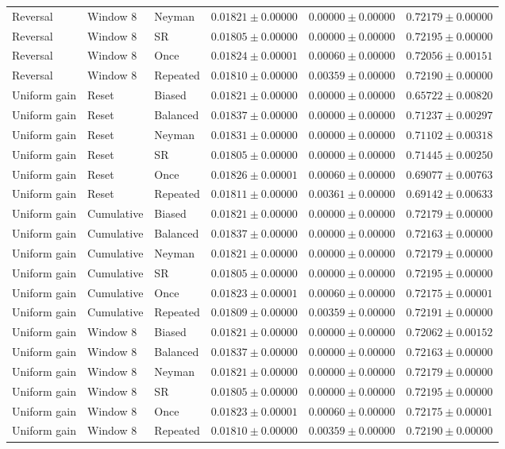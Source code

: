 \begin{longtable}{@{}llllll@{}}
Reversal & Window 8 & Neyman & $0.01821 \pm 0.00000$ & $0.00000 \pm 0.00000$ & $0.72179 \pm 0.00000$ \\
Reversal & Window 8 & SR & $0.01805 \pm 0.00000$ & $0.00000 \pm 0.00000$ & $0.72195 \pm 0.00000$ \\
Reversal & Window 8 & Once & $0.01824 \pm 0.00001$ & $0.00060 \pm 0.00000$ & $0.72056 \pm 0.00151$ \\
Reversal & Window 8 & Repeated & $0.01810 \pm 0.00000$ & $0.00359 \pm 0.00000$ & $0.72190 \pm 0.00000$ \\
Uniform gain & Reset & Biased & $0.01821 \pm 0.00000$ & $0.00000 \pm 0.00000$ & $0.65722 \pm 0.00820$ \\
Uniform gain & Reset & Balanced & $0.01837 \pm 0.00000$ & $0.00000 \pm 0.00000$ & $0.71237 \pm 0.00297$ \\
Uniform gain & Reset & Neyman & $0.01831 \pm 0.00000$ & $0.00000 \pm 0.00000$ & $0.71102 \pm 0.00318$ \\
Uniform gain & Reset & SR & $0.01805 \pm 0.00000$ & $0.00000 \pm 0.00000$ & $0.71445 \pm 0.00250$ \\
Uniform gain & Reset & Once & $0.01826 \pm 0.00001$ & $0.00060 \pm 0.00000$ & $0.69077 \pm 0.00763$ \\
Uniform gain & Reset & Repeated & $0.01811 \pm 0.00000$ & $0.00361 \pm 0.00000$ & $0.69142 \pm 0.00633$ \\
Uniform gain & Cumulative & Biased & $0.01821 \pm 0.00000$ & $0.00000 \pm 0.00000$ & $0.72179 \pm 0.00000$ \\
Uniform gain & Cumulative & Balanced & $0.01837 \pm 0.00000$ & $0.00000 \pm 0.00000$ & $0.72163 \pm 0.00000$ \\
Uniform gain & Cumulative & Neyman & $0.01821 \pm 0.00000$ & $0.00000 \pm 0.00000$ & $0.72179 \pm 0.00000$ \\
Uniform gain & Cumulative & SR & $0.01805 \pm 0.00000$ & $0.00000 \pm 0.00000$ & $0.72195 \pm 0.00000$ \\
Uniform gain & Cumulative & Once & $0.01823 \pm 0.00001$ & $0.00060 \pm 0.00000$ & $0.72175 \pm 0.00001$ \\
Uniform gain & Cumulative & Repeated & $0.01809 \pm 0.00000$ & $0.00359 \pm 0.00000$ & $0.72191 \pm 0.00000$ \\
Uniform gain & Window 8 & Biased & $0.01821 \pm 0.00000$ & $0.00000 \pm 0.00000$ & $0.72062 \pm 0.00152$ \\
Uniform gain & Window 8 & Balanced & $0.01837 \pm 0.00000$ & $0.00000 \pm 0.00000$ & $0.72163 \pm 0.00000$ \\
Uniform gain & Window 8 & Neyman & $0.01821 \pm 0.00000$ & $0.00000 \pm 0.00000$ & $0.72179 \pm 0.00000$ \\
Uniform gain & Window 8 & SR & $0.01805 \pm 0.00000$ & $0.00000 \pm 0.00000$ & $0.72195 \pm 0.00000$ \\
Uniform gain & Window 8 & Once & $0.01823 \pm 0.00001$ & $0.00060 \pm 0.00000$ & $0.72175 \pm 0.00001$ \\
Uniform gain & Window 8 & Repeated & $0.01810 \pm 0.00000$ & $0.00359 \pm 0.00000$ & $0.72190 \pm 0.00000$ \\
\end{longtable}\endgroup
